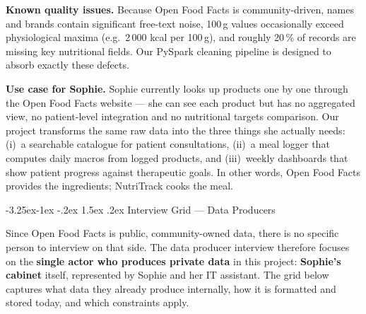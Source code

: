 \documentclass[a4paper,11pt,oneside,openany]{report}
\makeatletter
\renewcommand\subsection{\@startsection{subsection}{2}{\z@}%
  {-3.25ex\@plus -1ex \@minus -.2ex}%
  {1.5ex \@plus .2ex}%
  {\normalfont\large\bfseries\color{ntdarkgreen}}}
\newcommand{\off}{Open Food Facts}
\makeatother
\begin{document}
\textbf{Known quality issues.} Because \off{} is community-driven,
names and brands contain significant free-text noise, 100\,g
values occasionally exceed physiological maxima (e.g.\ 2\,000 kcal
per 100\,g), and roughly 20\,\% of records are missing key
nutritional fields. Our PySpark cleaning pipeline is designed to
absorb exactly these defects.

\textbf{Use case for Sophie.} Sophie currently looks up products
one by one through the \off{} website --- she can see each product
but has no aggregated view, no patient-level integration and no
nutritional targets comparison. Our project transforms the same
raw data into the three things she actually needs: (i)~a
searchable catalogue for patient consultations, (ii)~a meal logger
that computes daily macros from logged products, and (iii)~weekly
dashboards that show patient progress against therapeutic goals.
In other words, \off{} provides the ingredients; NutriTrack cooks
the meal.

\subsection{Interview Grid --- Data Producers}

Since \off{} is public, community-owned data, there is no specific
person to interview on that side. The data producer interview
therefore focuses on the \textbf{single actor who produces private
data} in this project: \textbf{Sophie's cabinet} itself, represented
by Sophie and her IT assistant. The grid below captures what data
they already produce internally, how it is formatted and stored
today, and which constraints apply.
\end{document}
